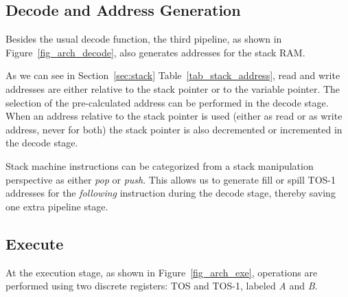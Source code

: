 \subsection{Decode and Address Generation}

Besides the usual decode function, the third pipeline, as shown in
Figure~\ref{fig_arch_decode}, also generates addresses for the stack
RAM.


As we can see in Section~\ref{sec:stack}
Table~\ref{tab_stack_address}, read and write addresses are either
relative to the stack pointer or to the variable pointer. The
selection of the pre-calculated address can be performed in the
decode stage. When an address relative to the stack pointer is used
(either as read or as write address, never for both) the stack
pointer is also decremented or incremented in the decode stage.

Stack machine instructions can be categorized from a stack
manipulation perspective as either \emph{pop} or \emph{push}. This
allows us to generate fill or spill TOS-1 addresses for the
\emph{following} instruction during the decode stage, thereby saving
one extra pipeline stage.


\subsection{Execute}

At the execution stage, as shown in Figure~\ref{fig_arch_exe},
operations are performed using two discrete registers: TOS and
TOS-1, labeled \emph{A} and \emph{B}.

